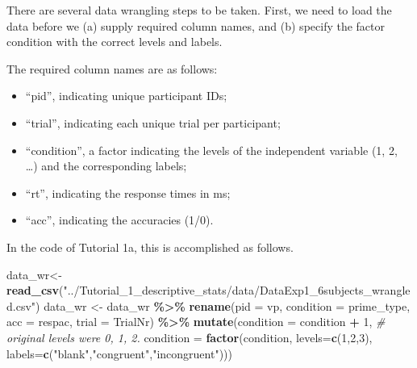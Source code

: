 \documentclass[
  man, donotrepeattitle,floatsintext]{apa6}
\newenvironment{Shaded}{\begin{snugshade}}{\end{snugshade}}
\newcommand{\AttributeTok}[1]{\textcolor[rgb]{0.13,0.29,0.53}{#1}}
\newcommand{\CommentTok}[1]{\textcolor[rgb]{0.56,0.35,0.01}{\textit{#1}}}
\newcommand{\DecValTok}[1]{\textcolor[rgb]{0.00,0.00,0.81}{#1}}
\newcommand{\FunctionTok}[1]{\textcolor[rgb]{0.13,0.29,0.53}{\textbf{#1}}}
\newcommand{\NormalTok}[1]{#1}
\newcommand{\OtherTok}[1]{\textcolor[rgb]{0.56,0.35,0.01}{#1}}
\newcommand{\SpecialCharTok}[1]{\textcolor[rgb]{0.81,0.36,0.00}{\textbf{#1}}}
\newcommand{\StringTok}[1]{\textcolor[rgb]{0.31,0.60,0.02}{#1}}
\providecommand{\tightlist}{%
  \setlength{\itemsep}{0pt}\setlength{\parskip}{0pt}}
\begin{document}
There are several data wrangling steps to be taken. First, we need to load the data before we (a) supply required column names, and (b) specify the factor condition with the correct levels and labels.

The required column names are as follows:

\begin{itemize}
\tightlist
\item
  ``pid'', indicating unique participant IDs;
\item
  ``trial'', indicating each unique trial per participant;
\item
  ``condition'', a factor indicating the levels of the independent variable (1, 2, \ldots) and the corresponding labels;
\item
  ``rt'', indicating the response times in ms;
\item
  ``acc'', indicating the accuracies (1/0).
\end{itemize}

In the code of Tutorial 1a, this is accomplished as follows.

\footnotesize

\begin{Shaded}
\begin{Highlighting}[]
\NormalTok{data\_wr}\OtherTok{\textless{}{-}}\FunctionTok{read\_csv}\NormalTok{(}\StringTok{"../Tutorial\_1\_descriptive\_stats/data/DataExp1\_6subjects\_wrangled.csv"}\NormalTok{)}
\NormalTok{data\_wr }\OtherTok{\textless{}{-}}\NormalTok{ data\_wr }\SpecialCharTok{\%\textgreater{}\%} 
  \FunctionTok{rename}\NormalTok{(}\AttributeTok{pid =}\NormalTok{ vp, }\AttributeTok{condition =}\NormalTok{ prime\_type, }\AttributeTok{acc =}\NormalTok{ respac, }\AttributeTok{trial =}\NormalTok{ TrialNr) }\SpecialCharTok{\%\textgreater{}\%} 
  \FunctionTok{mutate}\NormalTok{(}\AttributeTok{condition =}\NormalTok{ condition }\SpecialCharTok{+} \DecValTok{1}\NormalTok{, }\CommentTok{\# original levels were 0, 1, 2.}
         \AttributeTok{condition =} \FunctionTok{factor}\NormalTok{(condition, }
                            \AttributeTok{levels=}\FunctionTok{c}\NormalTok{(}\DecValTok{1}\NormalTok{,}\DecValTok{2}\NormalTok{,}\DecValTok{3}\NormalTok{), }
                            \AttributeTok{labels=}\FunctionTok{c}\NormalTok{(}\StringTok{"blank"}\NormalTok{,}\StringTok{"congruent"}\NormalTok{,}\StringTok{"incongruent"}\NormalTok{)))}
\end{Highlighting}
\end{Shaded}

\normalsize
\end{document}
